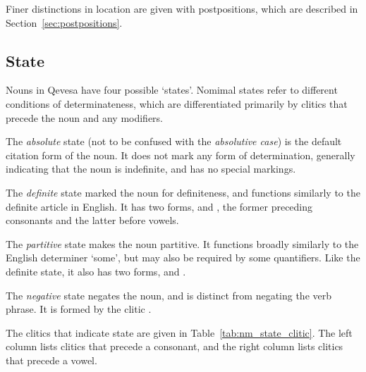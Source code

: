 \documentclass[grammar]{subfiles}
\begin{document}
  Finer distinctions in location are given with postpositions, which are
  described in Section~\ref{sec:postpositions}.

  \subsection{State}
  \label{ssec:nm_state}

  Nouns in Qevesa have four possible ‘states’.  Nomimal states refer to
  different conditions of determinateness, which are differentiated primarily
  by clitics that precede the noun and any modifiers. 

  The \emph{absolute} state (not to be confused with the \emph{absolutive
    case}) is the default citation form of the noun.  It does not mark any form
  of determination, generally indicating that the noun is indefinite, and has
  no special markings.

  The \emph{definite} state marked the noun for definiteness, and functions
  similarly to the definite article in English. 
  It has two forms,  and , the former preceding consonants
  and the latter before vowels.  

  The \emph{partitive} state makes the noun partitive.  It functions broadly
  similarly to the English determiner ‘some’, but may also be required by some
  quantifiers. 
  Like the definite state, it also has two forms,  and
  .   

  The \emph{negative} state negates the noun, and is distinct from negating the
  verb phrase.  It is formed by the clitic . 

  The clitics that indicate state are given in Table~\ref{tab:nm_state_clitic}.
  The left column lists clitics that precede a consonant, and the right column
  lists clitics that precede a vowel.

\end{document}
